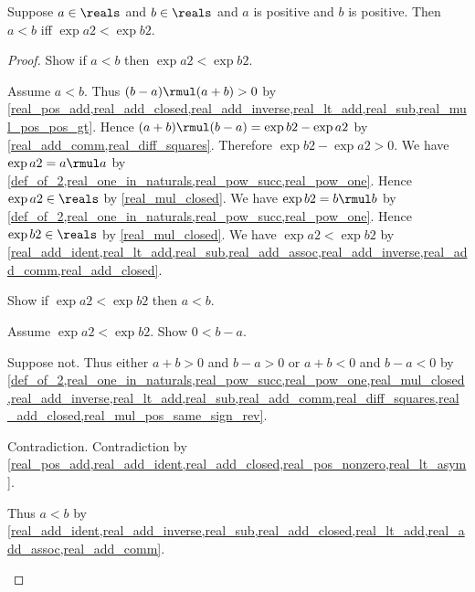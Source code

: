 \begin{proposition}\label{real_pos_lt_iff_sq_lt}
    Suppose $a\in\reals$ and $b\in\reals$ and $a$ is positive and $b$ is positive.
    Then $a < b$ iff $\exp{a}{2} < \exp{b}{2}$.
\end{proposition}
\begin{proof}
    Show if $a < b$ then $\exp{a}{2} < \exp{b}{2}$.
    \begin{subproof}
        Assume $a < b$.
        Thus $(b - a) \rmul (a + b) > 0$ by \cref{real_pos_add,real_add_closed,real_add_inverse,real_lt_add,real_sub,real_mul_pos_pos_gt}.
        Hence $(a + b) \rmul (b - a) = \exp{b}{2} - \exp{a}{2}$ by \cref{real_add_comm,real_diff_squares}.
        Therefore $\exp{b}{2} - \exp{a}{2} > 0$.
        We have $\exp{a}{2} = a \rmul a$ by \cref{def_of_2,real_one_in_naturals,real_pow_succ,real_pow_one}.
        Hence $\exp{a}{2}\in\reals$ by \cref{real_mul_closed}.
        We have $\exp{b}{2} = b \rmul b$ by \cref{def_of_2,real_one_in_naturals,real_pow_succ,real_pow_one}.
        Hence $\exp{b}{2}\in\reals$ by \cref{real_mul_closed}.
        We have $\exp{a}{2} < \exp{b}{2}$ by \cref{real_add_ident,real_lt_add,real_sub,real_add_assoc,real_add_inverse,real_add_comm,real_add_closed}.
    \end{subproof}
    Show if $\exp{a}{2} < \exp{b}{2}$ then $a < b$.
    \begin{subproof}
        Assume $\exp{a}{2} < \exp{b}{2}$.
        Show $0 < b - a$.
        \begin{subproof}
            Suppose not.
            Thus either $a + b > 0$ and $b - a > 0$ or $a + b < 0$ and $b - a < 0$ by \cref{def_of_2,real_one_in_naturals,real_pow_succ,real_pow_one,real_mul_closed,real_add_inverse,real_lt_add,real_sub,real_add_comm,real_diff_squares,real_add_closed,real_mul_pos_same_sign_rev}.
            \begin{byCase}
                Contradiction.
                Contradiction by \cref{real_pos_add,real_add_ident,real_add_closed,real_pos_nonzero,real_lt_asym}.
            \end{byCase}
        \end{subproof}
        Thus $a < b$ by \cref{real_add_ident,real_add_inverse,real_sub,real_add_closed,real_lt_add,real_add_assoc,real_add_comm}.
    \end{subproof}
\end{proof}

